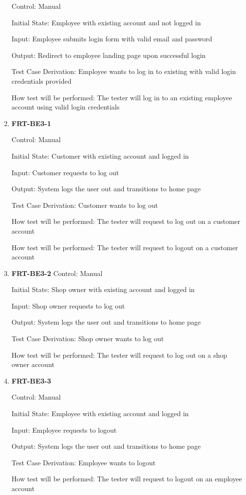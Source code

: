 \documentclass[12pt, titlepage]{article}
\begin{document}
\begin{enumerate}
	      Control: Manual

	      Initial State: Employee with existing account and not logged in

	      Input: Employee submits login form with valid email and password

	      Output: Redirect to employee landing page upon successful login

	      Test Case Derivation: Employee wants to log in to existing with valid login credentials provided

	      How test will be performed: The tester will log in to an existing employee account using valid
	      login credentials

	\item \textbf{FRT-BE3-1}

	      Control: Manual

	      Initial State: Customer with existing account and logged in

	      Input: Customer requests to log out

	      Output: System logs the user out and transitions to home page

	      Test Case Derivation: Customer wants to log out

	      How test will be performed: The tester will request to log out on a customer account

	      How test will be performed: The tester will request to logout on a customer account

	\item \textbf{FRT-BE3-2}
	      Control: Manual

	      Initial State: Shop owner with existing account and logged in

	      Input: Shop owner requests to log out

	      Output: System logs the user out and transitions to home page

	      Test Case Derivation: Shop owner wants to log out

	      How test will be performed: The tester will request to log out on a shop owner account

	\item \textbf{FRT-BE3-3}

	      Control: Manual

	      Initial State: Employee with existing account and logged in

	      Input: Employee requests to logout

	      Output: System logs the user out and transitions to home page

	      Test Case Derivation: Employee wants to logout

	      How test will be performed: The tester will request to logout on an employee account

\end{enumerate}
\end{document}
